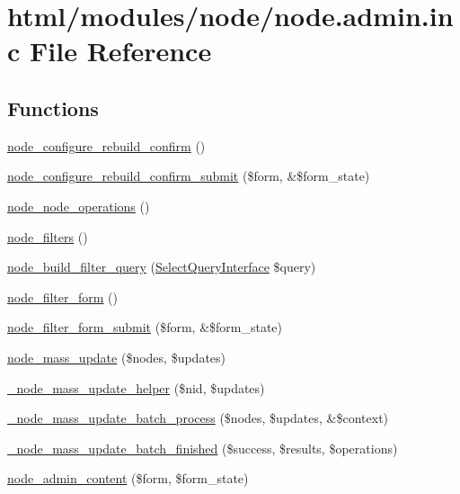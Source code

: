 \hypertarget{node_8admin_8inc}{
\section{html/modules/node/node.admin.inc File Reference}
\label{node_8admin_8inc}
}
\subsection*{Functions}
\begin{DoxyCompactItemize}
\item 
\hyperlink{group__forms_ga650b907eb478b9c293e4b93e3ecb560d}{node\_\-configure\_\-rebuild\_\-confirm} ()
\item 
\hyperlink{node_8admin_8inc_a81b709fbced4062b5c58137a9255fab4}{node\_\-configure\_\-rebuild\_\-confirm\_\-submit} (\$form, \&\$form\_\-state)
\item 
\hyperlink{node_8admin_8inc_a6e9cc98ef5c62744d557bf52b8531553}{node\_\-node\_\-operations} ()
\item 
\hyperlink{node_8admin_8inc_aa9c4e0dc2b5e8a9ca9c855161ca02969}{node\_\-filters} ()
\item 
\hyperlink{node_8admin_8inc_a2bbebf8ee912c5658a7a22a744d47da0}{node\_\-build\_\-filter\_\-query} (\hyperlink{interfaceSelectQueryInterface}{SelectQueryInterface} \$query)
\item 
\hyperlink{group__forms_ga2b7edb82b488db11ffde4fa60958004d}{node\_\-filter\_\-form} ()
\item 
\hyperlink{node_8admin_8inc_a346f00ebb9b4aae36025623d893c5061}{node\_\-filter\_\-form\_\-submit} (\$form, \&\$form\_\-state)
\item 
\hyperlink{node_8admin_8inc_ab40a38d08f170c418b0dac544d8ba97c}{node\_\-mass\_\-update} (\$nodes, \$updates)
\item 
\hyperlink{node_8admin_8inc_a664540e1e689d8cdd4850bb7cb498a09}{\_\-node\_\-mass\_\-update\_\-helper} (\$nid, \$updates)
\item 
\hyperlink{node_8admin_8inc_a5960eac661f3d304ee9861fa25c53d80}{\_\-node\_\-mass\_\-update\_\-batch\_\-process} (\$nodes, \$updates, \&\$context)
\item 
\hyperlink{node_8admin_8inc_ad95a05e860d4e44deb46b8af92a7fe25}{\_\-node\_\-mass\_\-update\_\-batch\_\-finished} (\$success, \$results, \$operations)
\item 
\hyperlink{group__forms_ga9e864b6f961a37906f23989987913091}{node\_\-admin\_\-content} (\$form, \$form\_\-state)

\end{DoxyCompactItemize}
